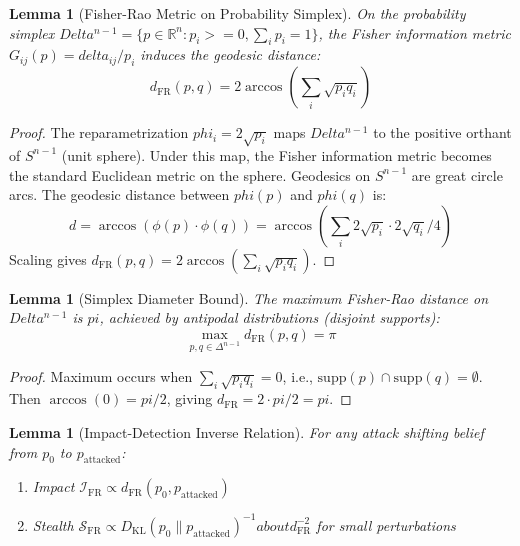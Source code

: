 \documentclass[
]{article}
\newtheorem{lemma}[theorem]{Lemma}
\begin{document}
\begin{lemma}[Fisher-Rao Metric on Probability Simplex]
\label{lem:fr-metric}
On the probability simplex $Delta^{n-1} = \{p \in \mathbb{R}^n : p_i >= 0, \sum_i p_i = 1\}$, the Fisher information metric $G_{ij}(p) = delta_{ij}/p_i$ induces the geodesic distance:
\begin{equation}
\label{eq:fr-geodesic}
d_{\mathrm{FR}}(p, q) = 2\arccos\!\left(\sum_i \sqrt{p_i q_i}\right)
\end{equation}
\end{lemma}

\begin{proof}
The reparametrization $phi_i = 2\sqrt{p_i}$ maps $Delta^{n-1}$ to the positive orthant of $S^{n-1}$ (unit sphere). Under this map, the Fisher information metric becomes the standard Euclidean metric on the sphere. Geodesics on $S^{n-1}$ are great circle arcs. The geodesic distance between $phi(p)$ and $phi(q)$ is:
\begin{equation}
\label{eq:fr-proof-1}
d = \arccos(\phi(p) \cdot \phi(q)) = \arccos\!\left(\sum_i 2\sqrt{p_i} \cdot 2\sqrt{q_i} / 4\right)
\end{equation}
Scaling gives $d_{\mathrm{FR}}(p, q) = 2\arccos(\sum_i \sqrt{p_i q_i})$.
\end{proof}

\begin{lemma}[Simplex Diameter Bound]
\label{lem:simplex-diameter}
The maximum Fisher-Rao distance on $Delta^{n-1}$ is $pi$, achieved by antipodal distributions (disjoint supports):
\begin{equation}
\label{eq:diameter-bound}
\max_{p, q \in \Delta^{n-1}} d_{\mathrm{FR}}(p, q) = \pi
\end{equation}
\end{lemma}

\begin{proof}
Maximum occurs when $\sum_i \sqrt{p_i q_i} = 0$, i.e., $\text{supp}(p) \cap \text{supp}(q) = \emptyset$. Then $\arccos(0) = pi/2$, giving $d_{\mathrm{FR}} = 2 \cdot pi/2 = pi$.
\end{proof}

\begin{lemma}[Impact-Detection Inverse Relation]
\label{lem:impact-stealth-inverse}
For any attack shifting belief from $p_0$ to $p_{\text{attacked}}$:
\begin{enumerate}
\item Impact $\mathcal{I}_{\mathrm{FR}} \propto d_{\mathrm{FR}}(p_0, p_{\text{attacked}})$
\item Stealth $\mathcal{S}_{\mathrm{FR}} \propto D_{\mathrm{KL}}(p_0 \| p_{\text{attacked}})^{-1} about d_{\mathrm{FR}}^{-2}$ for small perturbations
\end{enumerate}
\end{lemma}
\end{document}
